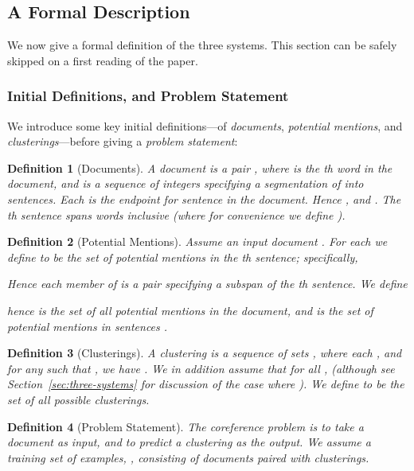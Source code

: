 \documentclass[11pt,a4paper]{article}
\newtheorem{definition}{Definition}
\begin{document}
\subsection{A Formal Description}

We now give a formal definition of the three systems. This section can be safely skipped on a first reading of the paper.

\subsubsection{Initial Definitions, and Problem Statement}

We introduce some key initial definitions---of {\em documents}, {\em potential mentions}, and {\em clusterings}---before giving a {\em problem statement}:

\begin{definition}[Documents]
A document is a pair , where  is the th word in the document, and  is a sequence of integers specifying a segmentation of  into  sentences. Each  is the endpoint for sentence  in the document. Hence , and . The th sentence spans words  inclusive (where for convenience we define ).
\end{definition}

\begin{definition}[Potential Mentions]
Assume an input document .
For each  we define  to be the set of {\em potential mentions} in the th sentence; specifically,

Hence each member of  is a pair  specifying a subspan of the th sentence. We define

hence  is the set of all potential mentions in the document, and  is the set of potential mentions in sentences .
\end{definition}

\begin{definition}[Clusterings]
A clustering  is a sequence of sets , where each , and for any  such that , we have . We in addition assume that for all ,  (although see Section~\ref{sec:three-systems} for discussion of the case where ). We define  to be the set of all possible clusterings. 
\end{definition}

\begin{definition}[Problem Statement] 
The coreference problem is to take a document  as input, and to predict a clustering  as the output. We assume a training set of  examples, , consisting of documents paired with clusterings.
\end{definition}
\end{document}
